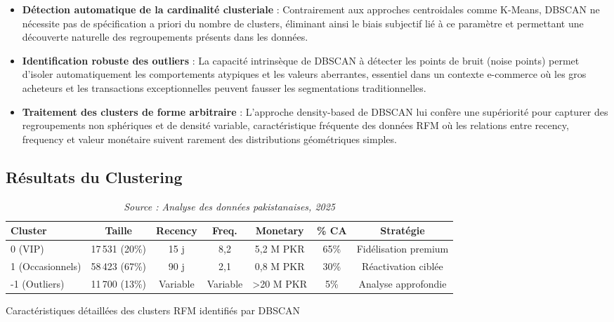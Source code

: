 \documentclass[a4paper,12pt]{article}
\begin{document}
\begin{itemize}
    \item \textbf{Détection automatique de la cardinalité clusteriale} : Contrairement aux approches centroidales comme K-Means, DBSCAN ne nécessite pas de spécification a priori du nombre de clusters, éliminant ainsi le biais subjectif lié à ce paramètre et permettant une découverte naturelle des regroupements présents dans les données.
    
    \item \textbf{Identification robuste des outliers} : La capacité intrinsèque de DBSCAN à détecter les points de bruit (noise points) permet d'isoler automatiquement les comportements atypiques et les valeurs aberrantes, essentiel dans un contexte e-commerce où les gros acheteurs et les transactions exceptionnelles peuvent fausser les segmentations traditionnelles.
    
    \item \textbf{Traitement des clusters de forme arbitraire} : L'approche density-based de DBSCAN lui confère une supériorité pour capturer des regroupements non sphériques et de densité variable, caractéristique fréquente des données RFM où les relations entre recency, frequency et valeur monétaire suivent rarement des distributions géométriques simples.
\end{itemize}

\subsection{Résultats du Clustering}

\begin{table}[H]
\centering
\begin{tabular}{|l|c|c|c|c|c|c|}
\hline
\textbf{Cluster} & \textbf{Taille} & \textbf{Recency} & \textbf{Freq.} & \textbf{Monetary} & \textbf{\% CA} & \textbf{Stratégie} \\
\hline
0 (VIP) & 17\,531 (20\%) & 15 j & 8,2 & 5,2 M PKR & 65\% & Fidélisation premium \\
\hline
1 (Occasionnels) & 58\,423 (67\%) & 90 j & 2,1 & 0,8 M PKR & 30\% & Réactivation ciblée \\
\hline
-1 (Outliers) & 11\,700 (13\%) & Variable & Variable & >20 M PKR & 5\% & Analyse approfondie \\
\hline
\end{tabular}
\caption{Caractéristiques détaillées des clusters RFM identifiés par DBSCAN}
\caption*{\textit{Source : Analyse des données pakistanaises, 2025}}
\label{tab:rfm_clusters_detailed}
\end{table}
\end{document}
